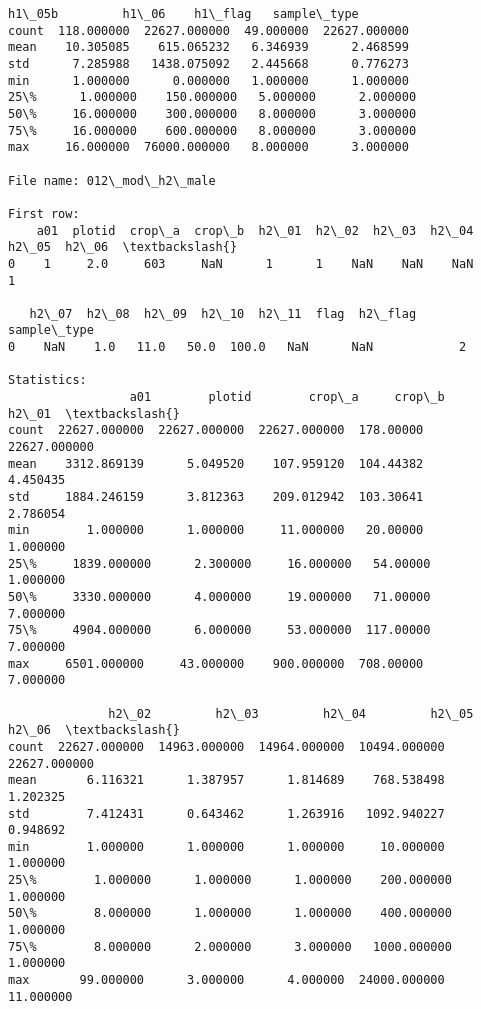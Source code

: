 \documentclass[11pt]{article}
\begin{document}
\begin{Verbatim}[commandchars=\\\{\}]
           h1\_05b         h1\_06    h1\_flag   sample\_type  
count  118.000000  22627.000000  49.000000  22627.000000  
mean    10.305085    615.065232   6.346939      2.468599  
std      7.285988   1438.075092   2.445668      0.776273  
min      1.000000      0.000000   1.000000      1.000000  
25\%      1.000000    150.000000   5.000000      2.000000  
50\%     16.000000    300.000000   8.000000      3.000000  
75\%     16.000000    600.000000   8.000000      3.000000  
max     16.000000  76000.000000   8.000000      3.000000  

File name: 012\_mod\_h2\_male

First row: 
    a01  plotid  crop\_a  crop\_b  h2\_01  h2\_02  h2\_03  h2\_04  h2\_05  h2\_06  \textbackslash{}
0    1     2.0     603     NaN      1      1    NaN    NaN    NaN      1   

   h2\_07  h2\_08  h2\_09  h2\_10  h2\_11  flag  h2\_flag  sample\_type  
0    NaN    1.0   11.0   50.0  100.0   NaN      NaN            2  

Statistics: 
                 a01        plotid        crop\_a     crop\_b         h2\_01  \textbackslash{}
count  22627.000000  22627.000000  22627.000000  178.00000  22627.000000   
mean    3312.869139      5.049520    107.959120  104.44382      4.450435   
std     1884.246159      3.812363    209.012942  103.30641      2.786054   
min        1.000000      1.000000     11.000000   20.00000      1.000000   
25\%     1839.000000      2.300000     16.000000   54.00000      1.000000   
50\%     3330.000000      4.000000     19.000000   71.00000      7.000000   
75\%     4904.000000      6.000000     53.000000  117.00000      7.000000   
max     6501.000000     43.000000    900.000000  708.00000      7.000000   

              h2\_02         h2\_03         h2\_04         h2\_05         h2\_06  \textbackslash{}
count  22627.000000  14963.000000  14964.000000  10494.000000  22627.000000   
mean       6.116321      1.387957      1.814689    768.538498      1.202325   
std        7.412431      0.643462      1.263916   1092.940227      0.948692   
min        1.000000      1.000000      1.000000     10.000000      1.000000   
25\%        1.000000      1.000000      1.000000    200.000000      1.000000   
50\%        8.000000      1.000000      1.000000    400.000000      1.000000   
75\%        8.000000      2.000000      3.000000   1000.000000      1.000000   
max       99.000000      3.000000      4.000000  24000.000000     11.000000   


\end{Verbatim}
\end{document}
